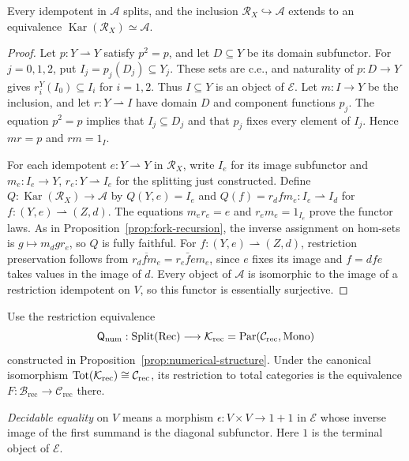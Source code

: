 \begin{corollary}\label{cor:fork-karoubi}
Every idempotent in $\mathcal A$ splits, and the inclusion
$\mathscr R_X\hookrightarrow\mathcal A$ extends to an equivalence
$\operatorname{Kar}(\mathscr R_X)\simeq\mathcal A$.
\end{corollary}
\begin{proof}
Let $p:Y\rightharpoonup Y$ satisfy $p^2=p$, and let
$D\subseteq Y$ be its domain subfunctor. For $j=0,1,2$, put
$I_j=p_j(D_j)\subseteq Y_j$. These sets are c.e., and naturality
of $p:D\to Y$ gives $r_i^Y(I_0)\subseteq I_i$ for $i=1,2$.
Thus $I\subseteq Y$ is an object of $\mathcal E$.
Let $m:I\to Y$ be the inclusion, and let
$r:Y\rightharpoonup I$ have domain $D$ and component functions $p_j$.
The equation $p^2=p$ implies that $I_j\subseteq D_j$ and that
$p_j$ fixes every element of $I_j$. Hence $mr=p$ and $rm=1_I$.

For each idempotent $e:Y\rightharpoonup Y$ in $\mathscr R_X$, write
$I_e$ for its image subfunctor and
$m_e:I_e\to Y$, $r_e:Y\rightharpoonup I_e$ for the splitting just
constructed. Define
$Q:\operatorname{Kar}(\mathscr R_X)\to\mathcal A$ by
$Q(Y,e)=I_e$ and
$Q(f)=r_d f m_e:I_e\rightharpoonup I_d$ for
$f:(Y,e)\rightharpoonup(Z,d)$.
The equations $m_er_e=e$ and $r_em_e=1_{I_e}$ prove the functor
laws. As in Proposition~\ref{prop:fork-recursion}, the inverse
assignment on hom-sets is $g\mapsto m_d g r_e$, so $Q$ is fully faithful.
For $f:(Y,e)\rightharpoonup(Z,d)$, restriction preservation follows from
$\overline{r_d f m_e}=r_e\bar f e m_e$, since $e$ fixes its image
and $f=dfe$ takes values in the image of $d$.
Every object of $\mathcal A$ is isomorphic to the image of a restriction
idempotent on $V$, so this functor is essentially surjective.
\end{proof}

Use the restriction equivalence
\[
 \mathsf Q_{\mathrm{num}}:\operatorname{Split}(\mathrm{Rec})
       \longrightarrow\mathcal K_{\mathrm{rec}}
       =\operatorname{Par}(\mathcal C_{\mathrm{rec}},\operatorname{Mono})
\]
constructed in Proposition~\ref{prop:numerical-structure}.
Under the canonical isomorphism
$\operatorname{Tot}(\mathcal K_{\mathrm{rec}})\cong\mathcal C_{\mathrm{rec}}$,
its restriction to total categories is the equivalence
$F:\mathcal B_{\mathrm{rec}}\to\mathcal C_{\mathrm{rec}}$ there.

\emph{Decidable equality} on $V$ means a morphism
$\epsilon:V\times V\to1+1$ in $\mathcal E$ whose inverse image of
the first summand is the diagonal subfunctor. Here $1$ is the terminal object of $\mathcal E$.

